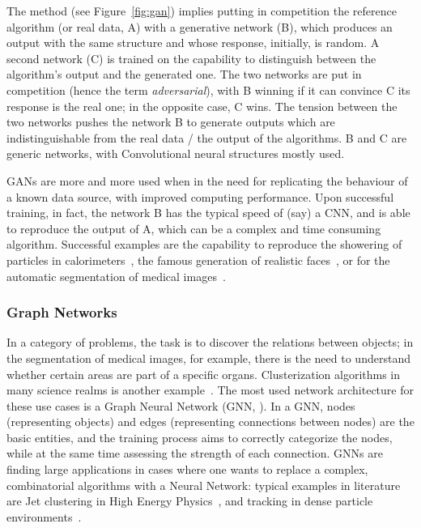 The method (see Figure~\ref{fig:gan}) implies putting in competition the reference algorithm (or real data, A) with a generative network (B), which produces an output with the same structure and whose response, initially, is random. A second network (C) is trained on the capability to distinguish between the algorithm's output and the generated one. The two networks are put in competition (hence the term \emph{adversarial}), with B winning if it can convince C its response is the real one; in the opposite case, C wins.
The tension between the two networks pushes the network B to generate outputs which are indistinguishable from the real data / the output of the  algorithms. B and C are generic networks, with Convolutional neural structures mostly used.

GANs are more and more used when in the need for replicating the behaviour of a known data source, with improved computing performance. Upon successful training, in fact, the network B has the typical speed of (say) a CNN, and is able to reproduce the output of A, which can be a complex and time consuming algorithm. Successful examples are the capability to reproduce the showering of particles in calorimeters~\cite{calogan}, the famous generation of realistic faces~\cite{faces}, or for the automatic segmentation of medical images~\cite{ganmed}.


\subsubsection{Graph Networks}
In a category of problems, the task is to discover the relations between objects; in the  segmentation of medical images, for example, there is the need to understand whether certain areas are part of a specific organs. Clusterization algorithms in many science realms is another example~\cite{clusterization}.
The most used  network architecture for these use cases is a Graph Neural Network (GNN, \cite{gnn}).
In a GNN, nodes (representing objects) and edges (representing connections between nodes) are the basic entities, and the training process aims to correctly categorize the nodes, while at the same time assessing the strength of each connection.
GNNs are finding large applications in cases where one wants to replace a complex, combinatorial algorithms with a Neural Network: typical examples in literature are Jet clustering in High Energy Physics~\cite{graphclustering}, and tracking in dense particle environments~\cite{graphtracking}.


